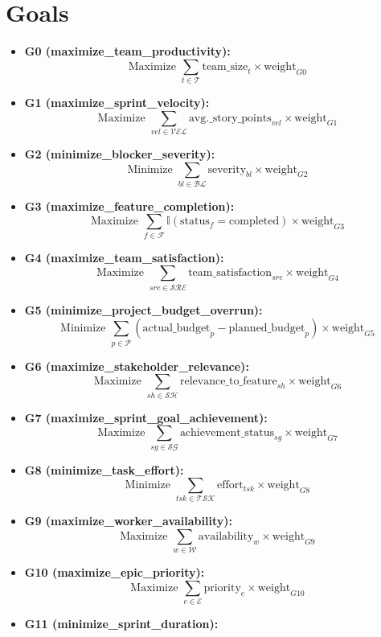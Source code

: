\documentclass{article}
\begin{document}
\section{Goals}
\begin{itemize}
    \item \textbf{G0 (maximize\_team\_productivity):}
    \[
    \text{Maximize } \sum_{t \in \mathcal{T}} \text{team\_size}_t \times \text{weight}_{G0}
    \]
    \item \textbf{G1 (maximize\_sprint\_velocity):}
    \[
    \text{Maximize } \sum_{vel \in \mathcal{VEL}} \text{avg.\_story\_points}_{vel} \times \text{weight}_{G1}
    \]
    \item \textbf{G2 (minimize\_blocker\_severity):}
    \[
    \text{Minimize } \sum_{bl \in \mathcal{BL}} \text{severity}_{bl} \times \text{weight}_{G2}
    \]
    \item \textbf{G3 (maximize\_feature\_completion):}
    \[
    \text{Maximize } \sum_{f \in \mathcal{F}} \mathbb{I}(\text{status}_f = \text{completed}) \times \text{weight}_{G3}
    \]
    \item \textbf{G4 (maximize\_team\_satisfaction):}
    \[
    \text{Maximize } \sum_{sre \in \mathcal{SRE}} \text{team\_satisfaction}_{sre} \times \text{weight}_{G4}
    \]
    \item \textbf{G5 (minimize\_project\_budget\_overrun):}
    \[
    \text{Minimize } \sum_{p \in \mathcal{P}} (\text{actual\_budget}_p - \text{planned\_budget}_p) \times \text{weight}_{G5}
    \]
    \item \textbf{G6 (maximize\_stakeholder\_relevance):}
    \[
    \text{Maximize } \sum_{sh \in \mathcal{SH}} \text{relevance\_to\_feature}_{sh} \times \text{weight}_{G6}
    \]
    \item \textbf{G7 (maximize\_sprint\_goal\_achievement):}
    \[
    \text{Maximize } \sum_{sg \in \mathcal{SG}} \text{achievement\_status}_{sg} \times \text{weight}_{G7}
    \]
    \item \textbf{G8 (minimize\_task\_effort):}
    \[
    \text{Minimize } \sum_{tsk \in \mathcal{TSK}} \text{effort}_{tsk} \times \text{weight}_{G8}
    \]
    \item \textbf{G9 (maximize\_worker\_availability):}
    \[
    \text{Maximize } \sum_{w \in \mathcal{W}} \text{availability}_w \times \text{weight}_{G9}
    \]
    \item \textbf{G10 (maximize\_epic\_priority):}
    \[
    \text{Maximize } \sum_{e \in \mathcal{E}} \text{priority}_e \times \text{weight}_{G10}
    \]
    \item \textbf{G11 (minimize\_sprint\_duration):}

\end{itemize}
\end{document}

